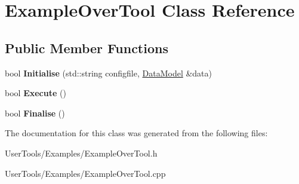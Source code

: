 \hypertarget{classExampleOverTool}{
\section{ExampleOverTool Class Reference}
\label{classExampleOverTool}
}
\subsection*{Public Member Functions}
\begin{DoxyCompactItemize}
\item 
\hypertarget{classExampleOverTool_ac7821b52bdffd736c9f4bb7265f2403c}{
bool {\bfseries Initialise} (std::string configfile, \hyperlink{classDataModel}{DataModel} \&data)}
\label{classExampleOverTool_ac7821b52bdffd736c9f4bb7265f2403c}

\item 
\hypertarget{classExampleOverTool_ae43f1902d5b79f6b474ba4b173ab0264}{
bool {\bfseries Execute} ()}
\label{classExampleOverTool_ae43f1902d5b79f6b474ba4b173ab0264}

\item 
\hypertarget{classExampleOverTool_aaf2c1cee9746ed6e94a9d58d8bc9fcae}{
bool {\bfseries Finalise} ()}
\label{classExampleOverTool_aaf2c1cee9746ed6e94a9d58d8bc9fcae}

\end{DoxyCompactItemize}


The documentation for this class was generated from the following files:\begin{DoxyCompactItemize}
\item 
UserTools/Examples/ExampleOverTool.h\item 
UserTools/Examples/ExampleOverTool.cpp\end{DoxyCompactItemize}
